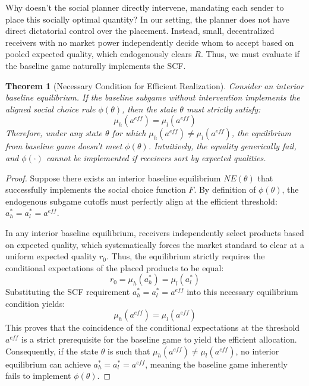 \documentclass[12pt, a4paper]{article}
\newtheorem{theorem}{Theorem}
\begin{document}
Why doesn't the social planner directly intervene, mandating each sender to place this socially optimal quantity? In our setting, the planner does not have direct dictatorial control over the placement. Instead, small, decentralized receivers with no market power independently decide whom to accept based on pooled expected quality, which endogenously clears $R$. Thus, we must evaluate if the baseline game naturally implements the SCF.

\begin{theorem}[Necessary Condition for Efficient Realization]
\label{Theorem: Impossibility of Baseline}
    Consider an interior baseline equilibrium. If the baseline subgame without intervention implements the aligned social choice rule $\phi(\theta)$, then the state $\theta$ must strictly satisfy:
    \[
        \mu_h(a^{eff}) = \mu_l(a^{eff})
    \]
    Therefore, under any state $\theta$ for which $\mu_h(a^{eff}) \neq \mu_l(a^{eff})$, the equilibrium from baseline game doesn't meet $\phi(\theta)$. Intuitively, the equality generically fail, and $\phi(\cdot)$ cannot be implemented if receivers sort by expected qualities. 
\end{theorem}

\begin{proof}
    Suppose there exists an interior baseline equilibrium $NE(\theta)$ that successfully implements the social choice function $F$. By definition of $\phi (\theta)$, the endogenous subgame cutoffs must perfectly align at the efficient threshold: $a_h^* = a_l^* = a^{eff}$.
    
    In any interior baseline equilibrium, receivers independently select products based on expected quality, which systematically forces the market standard to clear at a uniform expected quality $r_0$. Thus, the equilibrium strictly requires the conditional expectations of the placed products to be equal:
    \[
        r_0 = \mu_h(a_h^*) = \mu_l(a_l^*)
    \]
    Substituting the SCF requirement $a_h^* = a_l^* = a^{eff}$ into this necessary equilibrium condition yields:
    \[
        \mu_h(a^{eff}) = \mu_l(a^{eff})
    \]
    This proves that the coincidence of the conditional expectations at the threshold $a^{eff}$ is a strict prerequisite for the baseline game to yield the efficient allocation. Consequently, if the state $\theta$ is such that $\mu_h(a^{eff}) \neq \mu_l(a^{eff})$, no interior equilibrium can achieve $a_h^* = a_l^* = a^{eff}$, meaning the baseline game inherently fails to implement $\phi (\theta)$.
\end{proof}
\end{document}
